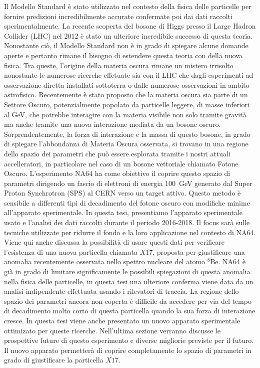 Il Modello Standard è stato utilizzato nel contesto della fisica delle particelle per fornire predizioni incredibilmente accurate confermate poi dai dati raccolti sperimentalmente. La recente scoperta del bosone di Higgs presso il Large Hadron Collider (LHC) nel 2012 è stato un ulteriore incredibile successo di questa teoria. Nonostante ciò, il Modello Standard non è in grado di spiegare alcune domande aperte e pertanto rimane il bisogno di estendere questa teoria con della nuova fisica. Tra queste, l'origine della materia oscura rimane un mistero irrisolto nonostante le numerose ricerche effetuate sia con il LHC che dagli esperimenti ad osservazione diretta installati sottoterra o dalle numerose osservazioni in ambito astrofisico. Recentemente è stato proposto che la materia oscura sia parte di un Settore Oscuro, potenzialmente popolato da particelle leggere, di masse inferiori al \si{\giga\electronvolt}, che potrebbe interagire con la materia visibile non solo tramite gravità ma anche tramite una nuova interazione mediata da un bosone oscuro.
Sorprendentemente, la forza di interazione e la massa di questo bosone, in grado di spiegare l'abbondanza di Materia Oscura osservata, si trovano in una regione dello spazio dei parametri che può essere esplorata tramite i nostri attuali accelleratori, in particolare nel caso di un bosone vettoriale chiamato Fotone Oscuro.
L'esperimento NA64 ha come obiettivo il coprire questo spazio di parametri dirigendo un fascio di elettroni di energia \SI{100}{\giga\electronvolt} generato dal Super Proton Synchrotron (SPS) al CERN verso un target attivo. Questo metodo è sensibile a differenti tipi di decadimento del fotone oscuro con modifiche minime all'apparato sperimentale. In questa tesi, presentiamo l'apparato sperimentale usato e l'analisi dei dati raccolti durante il periodo 2016-2018. Il focus sarà sulle tecniche utilizzate per ridurre il fondo e la loro applicazione nel contesto di NA64. Viene qui anche discussa la possibilità di usare questi dati per verificare l'esistenza di una nuova particella chiamata $X17$, proposta per giustificare una anomalia recentemente osservata nello spettro nucleare del atomo $^8$Be. NA64 è già in grado di limitare significamente le possibili spiegazioni di questa anomalia nella fisica delle particelle, in questa tesi una ulteriore conferma viene data da un analisi indipendente effettuata usando i rilevatori di traccia. La regione dello spazio dei parametri ancora non coperta è difficile da accedere per via del tempo di decadimento molto corto di questa particella quando la sua forza di interazione cresce. In questa tesi viene anche presentato un nuovo apparato sperimentale ottimizato per queste ricerche. Nell'ultima sezione verranno discusse le prospettive future di questo esperimento e diverse migliorie previste per il futuro. Il nuovo apparato permetterà di coprire completamente lo spazio di parametri in grado di giustificare la particella $X17$.